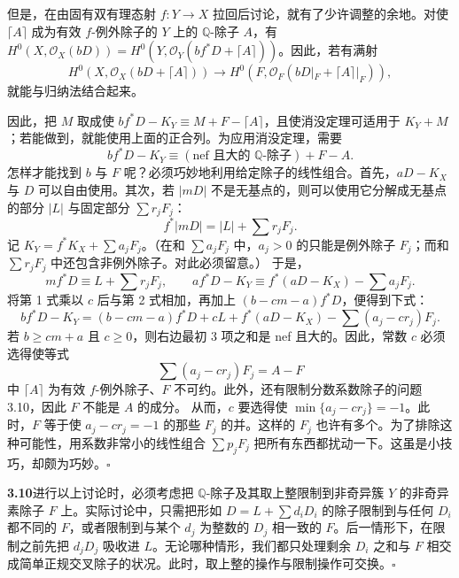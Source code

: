 但是，在由固有双有理态射 $f:Y\to X$ 拉回后讨论，就有了少许调整的余地。对使 $\lceil A\rceil$ 成为有效 $f$-例外除子的 $Y$ 上的 $\mathbb{Q}$-除子 $A$，有 $H^0(X,\mathcal{O}_X(bD))=H^0(Y,\mathcal{O}_Y(bf^*D+\lceil A\rceil))$。因此，若有满射
\[
H^0(X,\mathcal{O}_X(bD+\lceil A\rceil))\to H^0(F,\mathcal{O}_F(bD|_F+\lceil A\rceil|_F)),
\]
就能与归纳法结合起来。

因此，把 $M$ 取成使 $bf^*D-K_Y\equiv M+F-\lceil A\rceil$，且使消没定理可适用于 $K_Y+M$；若能做到，就能使用上面的正合列。为应用消没定理，需要
\[
bf^*D-K_Y\equiv(\text{nef 且大的 }\mathbb{Q}\text{-除子})+F-A.
\]
怎样才能找到 $b$ 与 $F$ 呢？必须巧妙地利用给定除子的线性组合。首先，$aD-K_X$ 与 $D$ 可以自由使用。其次，若 $|mD|$ 不是无基点的，则可以使用它分解成无基点的部分 $|L|$ 与固定部分 $\sum r_jF_j$：
\[
f^*|mD|=|L|+\sum r_jF_j.
\]
记 $K_Y=f^*K_X+\sum a_jF_j$。（在和 $\sum a_jF_j$ 中，$a_j>0$ 的只能是例外除子 $F_j$；而和 $\sum r_jF_j$ 中还包含非例外除子。对此必须留意。）
于是，
\[
mf^*D\equiv L+\sum r_jF_j,\qquad
af^*D-K_Y\equiv f^*(aD-K_X)-\sum a_jF_j.
\]
将第 1 式乘以 $c$ 后与第 2 式相加，再加上 $(b-cm-a)f^*D$，便得到下式：
\[
bf^*D-K_Y=(b-cm-a)f^*D+cL+f^*(aD-K_X)-\sum(a_j-cr_j)F_j.
\]
若 $b\geq cm+a$ 且 $c\geq 0$，则右边最初 3 项之和是 nef 且大的。因此，常数 $c$ 必须选得使等式
\[
\sum(a_j-cr_j)F_j=A-F
\]
中 $\lceil A\rceil$ 为有效 $f$-例外除子、$F$ 不可约。此外，还有限制分数系数除子的问题 3.10，因此 $F$ 不能是 $A$ 的成分。
从而，$c$ 要选得使 $\min\{a_j-cr_j\}=-1$。此时，$F$ 等于使 $a_j-cr_j=-1$ 的那些 $F_j$ 的并。这样的 $F_j$ 也许有多个。为了排除这种可能性，用系数非常小的线性组合 $\sum p_jF_j$ 把所有东西都扰动一下。这虽是小技巧，却颇为巧妙。\hfill$\square$\par\medskip

\par\medskip\noindent\textbf{3.10}\quad 进行以上讨论时，必须考虑把 $\mathbb{Q}$-除子及其取上整限制到非奇异簇 $Y$ 的非奇异素除子 $F$ 上。实际讨论中，只需把形如 $D=L+\sum d_iD_i$ 的除子限制到与任何 $D_i$ 都不同的 $F$，或者限制到与某个 $d_j$ 为整数的 $D_j$ 相一致的 $F$。后一情形下，在限制之前先把 $d_jD_j$ 吸收进 $L$。无论哪种情形，我们都只处理剩余 $D_i$ 之和与 $F$ 相交成简单正规交叉除子的状况。此时，取上整的操作与限制操作可交换。\hfill$\square$\par\medskip

